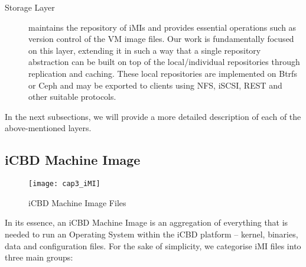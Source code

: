 \begin{description}
	\item [Storage Layer] maintains the repository of iMIs and provides essential operations such as version control of the VM image files. Our work is fundamentally focused on this layer, extending it in such a way that a single repository abstraction can be built on top of the local/individual repositories through replication and caching. These local repositories are implemented on Btrfs or Ceph and may be exported to clients using \acrshort{NFS}, \acrshort{iSCSI}, REST and other suitable protocols.
	
\end{description}
 
In the next subsections, we will provide a more detailed description of each of the above-mentioned layers.

\subsection{iCBD Machine Image}
\label{sub:icbd_imi}

\begin{figure}[htbp]
	\centering
	\texttt{[image: cap3\_iMI]}
	\caption{iCBD Machine Image Files}
	\label{fig:icbd_iMI_files}
\end{figure}

In its essence, an iCBD Machine Image is an aggregation of everything that is needed to run an Operating System within the iCBD platform – kernel, binaries, data and configuration files. For the sake of simplicity, we categorise iMI files into three main groups:


